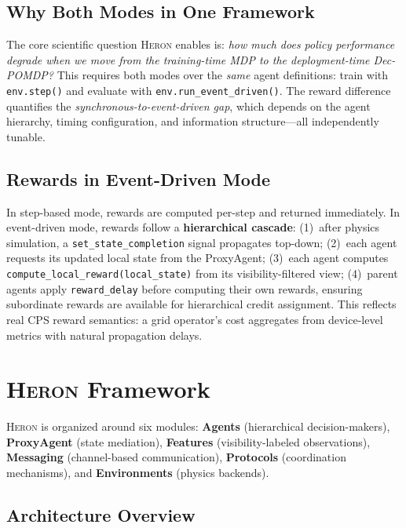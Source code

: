 \documentclass{article}
\newcommand{\heron}{\textsc{Heron}}
\begin{document}
\subsection{Why Both Modes in One Framework}

The core scientific question \heron{} enables is: \emph{how much does policy performance degrade when we move from the training-time MDP to the deployment-time Dec-POMDP?} This requires both modes over the \emph{same} agent definitions: train with \texttt{env.step()} and evaluate with \texttt{env.run\_event\_driven()}. The reward difference quantifies the \emph{synchronous-to-event-driven gap}, which depends on the agent hierarchy, timing configuration, and information structure---all independently tunable.

\subsection{Rewards in Event-Driven Mode}

In step-based mode, rewards are computed per-step and returned immediately. In event-driven mode, rewards follow a \textbf{hierarchical cascade}: (1)~after physics simulation, a \texttt{set\_state\_completion} signal propagates top-down; (2)~each agent requests its updated local state from the ProxyAgent; (3)~each agent computes \texttt{compute\_local\_reward(local\_state)} from its visibility-filtered view; (4)~parent agents apply \texttt{reward\_delay} before computing their own rewards, ensuring subordinate rewards are available for hierarchical credit assignment. This reflects real CPS reward semantics: a grid operator's cost aggregates from device-level metrics with natural propagation delays.

\section{\heron{} Framework}
\label{sec:framework}

\heron{} is organized around six modules: \textbf{Agents} (hierarchical decision-makers), \textbf{ProxyAgent} (state mediation), \textbf{Features} (visibility-labeled observations), \textbf{Messaging} (channel-based communication), \textbf{Protocols} (coordination mechanisms), and \textbf{Environments} (physics backends).

\subsection{Architecture Overview}
\label{sec:overview}
\end{document}

